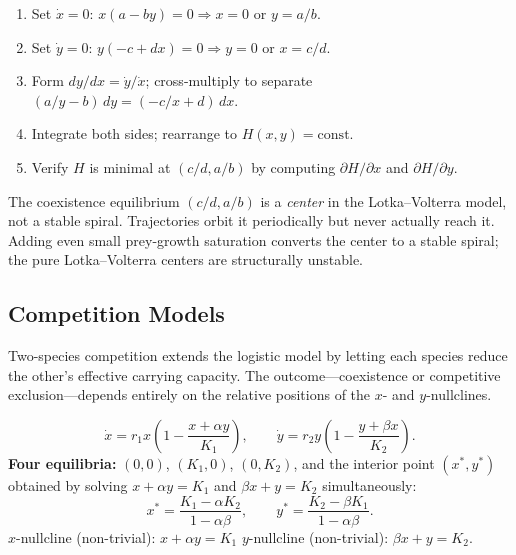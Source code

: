 \begin{methodbox}
\begin{enumerate}[leftmargin=1.6em, itemsep=3pt]
  \item Set $\dot{x} = 0$: $x(a - by) = 0 \Rightarrow x = 0$ or $y = a/b$.
  \item Set $\dot{y} = 0$: $y(-c + dx) = 0 \Rightarrow y = 0$ or $x = c/d$.
  \item Form $dy/dx = \dot{y}/\dot{x}$; cross-multiply to separate
        $(a/y - b)\,dy = (-c/x + d)\,dx$.
  \item Integrate both sides; rearrange to $H(x,y) = \text{const}$.
  \item Verify $H$ is minimal at $(c/d, a/b)$ by computing $\partial H/\partial x$
        and $\partial H/\partial y$.
\end{enumerate}
\end{methodbox}

\begin{warningbox}
The coexistence equilibrium $(c/d, a/b)$ is a \emph{center} in the Lotka--Volterra
model, not a stable spiral. Trajectories orbit it periodically but never actually
reach it. Adding even small prey-growth saturation converts the center to a stable
spiral; the pure Lotka--Volterra centers are structurally unstable.
\end{warningbox}

\subsection{Competition Models}

Two-species competition extends the logistic model by letting each species reduce
the other's effective carrying capacity. The outcome---coexistence or
competitive exclusion---depends entirely on the relative positions of the
$x$- and $y$-nullclines.

\begin{formulabox}
\[
  \dot{x} = r_1 x\!\left(1 - \frac{x + \alpha y}{K_1}\right),
  \qquad
  \dot{y} = r_2 y\!\left(1 - \frac{y + \beta x}{K_2}\right).
\]
\textbf{Four equilibria:} $(0,0)$, $(K_1, 0)$, $(0, K_2)$, and the interior
point $(x^*, y^*)$ obtained by solving $x + \alpha y = K_1$ and
$\beta x + y = K_2$ simultaneously:
\[
  x^* = \frac{K_1 - \alpha K_2}{1 - \alpha\beta}, \qquad
  y^* = \frac{K_2 - \beta K_1}{1 - \alpha\beta}.
\]
$x$-nullcline (non-trivial): $x + \alpha y = K_1$
\hfill
$y$-nullcline (non-trivial): $\beta x + y = K_2$.
\end{formulabox}

